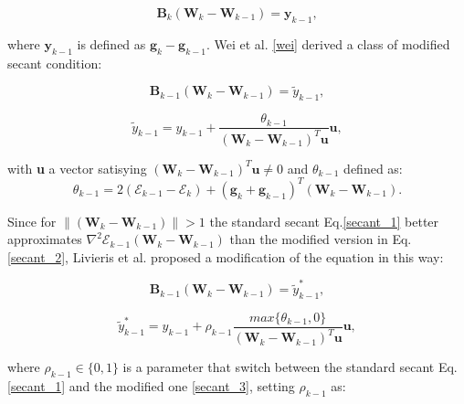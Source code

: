 			\begin{equation}
			\label{secant_1}
 				\textbf{B}_k (\textbf{W}_k - \textbf{W}_{k-1}) = \textbf{y}_{k-1},
 			\end{equation}

 			where $\textbf{y}_{k-1}$ is defined as $\textbf{g}_k - \textbf{g}_{k-1}$.
 			Wei et al. \ref{wei} derived a class of modified secant condition:

			\begin{equation}
			\label{secant_2}
 				\textbf{B}_{k-1} (\textbf{W}_k - \textbf{W}_{k-1}) = \widetilde{y}_{k-1},
 			\end{equation}		


			\begin{equation}
			\label{secant_2}
 			 \widetilde{y}_{k-1} =  y_{k-1} + \frac{\theta_{k-1}}{(\textbf{W}_k - \textbf{W}_{k-1})^T\textbf{u}}\textbf{u},  		
 			\end{equation}	

 			with \textbf{u} a vector satisying $(\textbf{W}_k - \textbf{W}_{k-1})^T\textbf{u} \neq 0$ and $\theta_{k-1}$ defined as:
 			\begin{equation}
			\label{theta}
 			 \theta_{k-1} = 2(\mathcal{E}_{k-1} - \mathcal{E}_{k}) + (\textbf{g}_k + \textbf{g}_{k-1})^T(\textbf{W}_k - \textbf{W}_{k-1}).
 			\end{equation}	


 			Since for $\|(\textbf{W}_k - \textbf{W}_{k-1})\| > 1$ the standard secant Eq.\ref{secant_1} better approximates $\nabla^2\mathcal{E}_{k-1}(\textbf{W}_k - \textbf{W}_{k-1})$ than the modified version in Eq.\ref{secant_2}, Livieris et al. proposed a modification of the equation in this way:

 			\begin{equation}
			\label{secant_3}
 				\textbf{B}_{k-1} (\textbf{W}_k - \textbf{W}_{k-1}) = \widetilde{y}_{k-1}^*,
 			\end{equation}	

 			\begin{equation}
			\label{y_3}
 				\widetilde{y}_{k-1}^* = y_{k-1} + \rho_{k-1} \frac{max\{\theta_{k-1},0\}}{(\textbf{W}_k - \textbf{W}_{k-1})^T\textbf{u}}\textbf{u},
 			\end{equation}

 			where $\rho_{k-1} \in \{0,1\}$ is a parameter that switch between the standard secant Eq.\ref{secant_1} and the modified one \ref{secant_3}, setting $\rho_{k-1}$ as:

